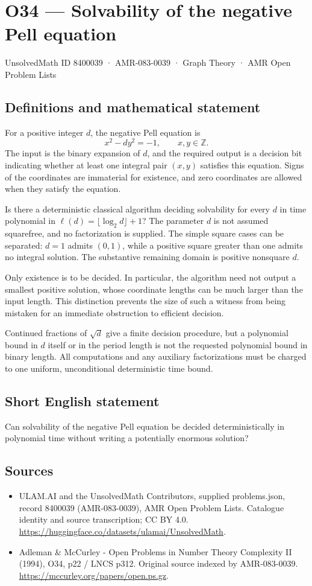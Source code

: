 \documentclass[11pt,a4paper]{article}
\begin{document}
\section*{O34 — Solvability of the negative Pell equation}\label{8400039}
{\small UnsolvedMath ID 8400039 · AMR-083-0039 · Graph Theory · AMR Open Problem Lists}
\subsection{Definitions and mathematical statement}
For a positive integer $d$, the negative Pell equation is
\[
x^2-dy^2=-1,\qquad x,y\in\mathbb Z.
\]
The input is the binary expansion of $d$, and the required output is a decision bit indicating whether at least one integral pair $(x,y)$ satisfies this equation. Signs of the coordinates are immaterial for existence, and zero coordinates are allowed when they satisfy the equation.

Is there a deterministic classical algorithm deciding solvability for every $d$ in time polynomial in $\ell(d)=\lfloor\log_2d\rfloor+1$? The parameter $d$ is not assumed squarefree, and no factorization is supplied. The simple square cases can be separated: $d=1$ admits $(0,1)$, while a positive square greater than one admits no integral solution. The substantive remaining domain is positive nonsquare $d$.

Only existence is to be decided. In particular, the algorithm need not output a smallest positive solution, whose coordinate lengths can be much larger than the input length. This distinction prevents the size of such a witness from being mistaken for an immediate obstruction to efficient decision.

Continued fractions of $\sqrt d$ give a finite decision procedure, but a polynomial bound in $d$ itself or in the period length is not the requested polynomial bound in binary length. All computations and any auxiliary factorizations must be charged to one uniform, unconditional deterministic time bound.
\subsection{Short English statement}
Can solvability of the negative Pell equation be decided deterministically in polynomial time without writing a potentially enormous solution?
\subsection{Sources}
\begin{itemize}
\item[S1] ULAM.AI and the UnsolvedMath Contributors, supplied problems.json, record 8400039 (AMR-083-0039), AMR Open Problem Lists. Catalogue identity and source transcription; CC BY 4.0.
\url{https://huggingface.co/datasets/ulamai/UnsolvedMath}.
\item[S2] Adleman \& McCurley - Open Problems in Number Theory Complexity II (1994), O34, p22 / LNCS p312. Original source indexed by AMR-083-0039.
\url{https://mccurley.org/papers/open.ps.gz}.
\end{itemize}
\end{document}
